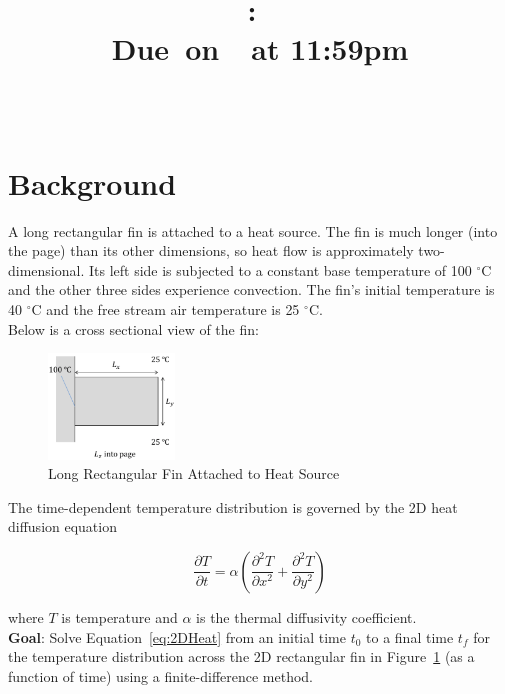 \documentclass{article}
\title{
    \vspace{2in}
    \textmd{\textbf{\hmwkClass:\ \hmwkTitle}}\\
    \normalsize\vspace{0.1in}\small{Due\ on\ \hmwkDueDate\ at 11:59pm}\\
    \vspace{0.1in}\large{\textit{\hmwkClassInstructor\ \hmwkClassTime}}
    \vspace{3in}
}
\author{\hmwkAuthorName}
\date{}
\newcommand{\pderiv}[2]{\displaystyle \frac{\partial #1}{\partial #2}}
\begin{document}
\maketitle

\pagebreak

\section{Background}
A long rectangular fin is attached to a heat source. The fin is much longer (into the page) than its other
dimensions, so heat flow is approximately two-dimensional. Its left side is subjected to a constant base
temperature of 100 ${}^{\circ}$C and the other three sides experience convection. The fin's initial temperature is\\
40 ${}^{\circ}$C and the free stream air temperature is 25 ${}^{\circ}$C. \\

Below is a cross sectional view of the fin:

\begin{figure}[h]
    \centering
    \includegraphics[width=0.3\textwidth]{fig/fin.png}
    \caption{Long Rectangular Fin Attached to Heat Source}
    \label{fig:fin}
\end{figure}

The time-dependent temperature distribution is governed by the 2D heat diffusion equation

\begin{equation}
    \pderiv{T}{t} = \alpha \left( \pderiv{^2 T}{x^2} + \pderiv{^2 T}{y^2}\right)
    \label{eq:2DHeat}
\end{equation}

where $T$ is temperature and $\alpha$ is the thermal diffusivity coefficient.\\

\textbf{Goal}: Solve Equation~\eqref{eq:2DHeat} from an initial time $t_0$ to a final time $t_f$ for the temperature distribution across the 2D rectangular fin in Figure~\ref{fig:fin} (as a function of time) using a finite-difference method.

\pagebreak
\end{document}
